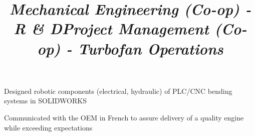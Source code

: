 \documentclass[mm]{res}
\begin{document}
\begin{resume}
\title{\textsl{Mechanical Engineering (Co-op) - R \& D}}
\begin{position}
\tb Designed robotic components (electrical, hydraulic) of PLC/CNC bending systems in SOLIDWORKS
\end{position}

\title{\textsl{Project Management (Co-op) - Turbofan Operations}}
\begin{position}
\tb Communicated with the OEM in French to assure delivery of a quality engine while exceeding expectations
\end{position}




\end{resume}
\end{document}
